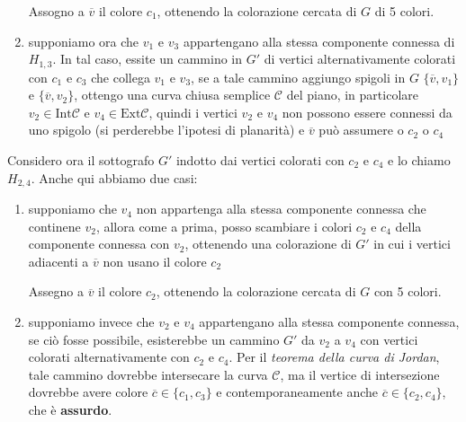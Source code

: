 \begin{flushleft}
\begin{boxA}
\begin{enumerate}[nosep]
            {\centering
                Assogno a $\overline{v}$ il colore $c_1$, ottenendo la colorazione cercata di $G$ di 5 colori.
            \par}
            \item supponiamo ora che $v_1$ e $v_3$ appartengano alla stessa componente connessa di $H_{1, 3}$. In tal caso, essite un cammino in $G'$ di vertici alternativamente colorati con $c_1$ e $c_3$ che collega $v_1$ e $v_3$, se a tale cammino aggiungo spigoli in $G$ $\{\overline{v}, v_1\}$ e $\{\overline{v}, v_2\}$, ottengo una curva chiusa semplice $\mathcal{C}$ del piano, in particolare $v_2 \in \text{Int}\mathcal{C}$ e $v_4 \in \text{Ext}\mathcal{C}$, quindi i vertici $v_2$ e $v_4$ non possono essere connessi da uno spigolo (si perderebbe l'ipotesi di planarità) e $\overline{v}$ può assumere o $c_2$ o $c_4$
        \end{enumerate}
        Considero ora il sottografo $G'$ indotto dai vertici colorati con $c_2$ e $c_4$ e lo chiamo $H_{2, 4}$. Anche qui abbiamo due casi:
        \begin{enumerate}[nosep]
            \item supponiamo che $v_4$ non appartenga alla stessa componente connessa che continene $v_2$, allora come a prima, posso scambiare i colori $c_2$ e $c_4$ della componente connessa con $v_2$, ottenendo una colorazione di $G'$ in cui i vertici adiacenti a $\overline{v}$ non usano il colore $c_2$

            {\centering
                Assegno a $\overline{v}$ il colore $c_2$, ottenendo la colorazione cercata di $G$ con 5 colori.
            \par}
            \item supponiamo invece che $v_2$ e $v_4$ appartengano alla stessa componente connessa, se ciò fosse possibile, esisterebbe un cammino $G'$ da $v_2$ a $v_4$ con vertici colorati alternativamente con $c_2$ e $c_4$. Per il \textit{teorema della curva di Jordan}, tale cammino dovrebbe intersecare la curva $\mathcal{C}$, ma il vertice di intersezione dovrebbe avere colore $\overline{c} \in \{c_1, c_3\}$ e contemporaneamente anche $\overline{c} \in \{c_2, c_4\}$, che è \textbf{assurdo}.
        \end{enumerate}
    \end{boxA}


\end{flushleft}

